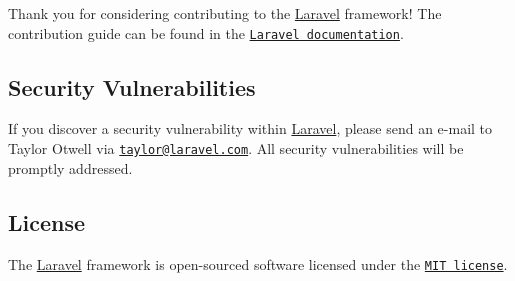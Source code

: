 Thank you for considering contributing to the \mbox{\hyperlink{namespace_laravel}{Laravel}} framework! The contribution guide can be found in the \href{https://laravel.com/docs/contributions}{\tt Laravel documentation}.

\subsection*{Security Vulnerabilities}

If you discover a security vulnerability within \mbox{\hyperlink{namespace_laravel}{Laravel}}, please send an e-\/mail to Taylor Otwell via \href{mailto:taylor@laravel.com}{\tt taylor@laravel.\+com}. All security vulnerabilities will be promptly addressed.

\subsection*{License}

The \mbox{\hyperlink{namespace_laravel}{Laravel}} framework is open-\/sourced software licensed under the \href{https://opensource.org/licenses/MIT}{\tt M\+IT license}. 